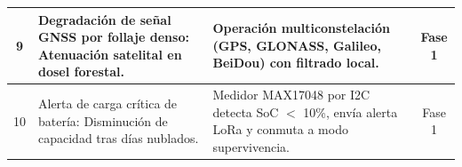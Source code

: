\begin{table}[H]
\begin{tabularx}{\textwidth}{|c X X c|}
9 & Degradación de señal GNSS por follaje denso: Atenuación satelital en dosel forestal. & Operación multiconstelación (GPS, GLONASS, Galileo, BeiDou) con filtrado local. & Fase 1 \\ \hline
10 & Alerta de carga crítica de batería: Disminución de capacidad tras días nublados. & Medidor MAX17048 por I2C detecta SoC $<$ 10\%, envía alerta LoRa y conmuta a modo supervivencia. & Fase 1 \\ \hline
\end{tabularx}
\end{table}